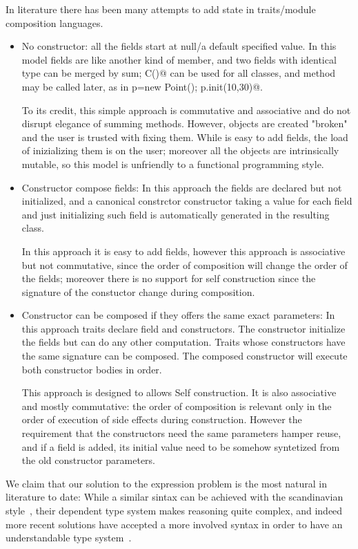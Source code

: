 In literature there has been many attempts to add state in traits/module composition languages.
\begin{itemize}  
\item No constructor: all the fields start at null/a default specified value.
  In this model fields are like another kind of member, and two fields
  with identical type can be merged by sum; \Q@new C()@ can be used for all classes, and \Q@init@ method may be called later, as in
  \Q@Point p=new Point(); p.init(10,30)@.
  
  To its credit, this simple approach is commutative and associative and do not disrupt elegance of summing methods.
  However, objects are created "broken" and the user is trusted with fixing them.
  While is easy to add fields, the load of inizializing them is on the user; moreover
    all the objects are intrinsically mutable, so this model is unfriendly
    to a functional programming style.
\item Constructor compose fields:
In this approach the fields are declared but not initialized, and
a canonical constrctor constructor taking a value for each field and just initializing such field
is automatically generated in the resulting class.

In this approach it is easy to add fields, however this approach is associative but not commutative, since the order of composition will change the order of the fields; moreover there is no support for self construction
since the signature of the constuctor change during composition.

\item Constructor can be composed if they offers the same exact parameters:
In this approach traits declare field and constructors.
The constructor initialize the fields but can do any other computation.
Traits whose constructors have the same signature can be composed.
The composed constructor will execute both constructor bodies in order.

This approach is designed to allows Self construction.
It is also associative and mostly commutative: the order of composition is relevant only
in the order of execution of side effects during construction.
However the requirement that the constructors need the same parameters 
hamper reuse, and if a field is added, its initial value need to be
somehow syntetized from the old constructor parameters.

\end{itemize}

We claim that our solution to the expression problem is the most natural in literature to date:
While a similar sintax can be achieved with the scandinavian style~\cite{ernst2004expression}, their dependent type system makes reasoning quite complex, and indeed more recent solutions have accepted a more involved syntax in order to have an understandable type system~\cite{igarashi2005lightweight}.

